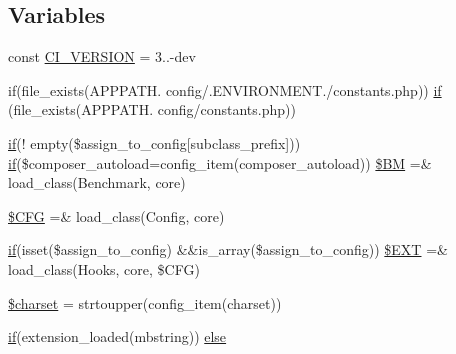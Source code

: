 \subsection*{Variables}
\begin{DoxyCompactItemize}
\item 
const \mbox{\hyperlink{_code_igniter_8php_a32e3c3927ba8ec93df92327dfd85d564}{C\+I\+\_\+\+V\+E\+R\+S\+I\+ON}} = \textquotesingle{}3..-\/dev\textquotesingle{}
\item 
if(file\+\_\+exists(A\+P\+P\+P\+A\+T\+H. \textquotesingle{}config/\textquotesingle{}.E\+N\+V\+I\+R\+O\+N\+M\+E\+N\+T.\textquotesingle{}/constants.\+php\textquotesingle{})) \mbox{\hyperlink{_code_igniter_8php_a565ae1002e1468af84434f86276c519e}{if}} (file\+\_\+exists(A\+P\+P\+P\+A\+T\+H. \textquotesingle{}config/constants.\+php\textquotesingle{}))
\item 
\mbox{\hyperlink{_code_igniter_8php_a565ae1002e1468af84434f86276c519e}{if}}(! empty(\$assign\+\_\+to\+\_\+config\mbox{[}\textquotesingle{}subclass\+\_\+prefix\textquotesingle{}\mbox{]})) \mbox{\hyperlink{_code_igniter_8php_a565ae1002e1468af84434f86276c519e}{if}}(\$composer\+\_\+autoload=config\+\_\+item(\textquotesingle{}composer\+\_\+autoload\textquotesingle{})) \mbox{\hyperlink{_code_igniter_8php_a13e4265227a370a54765a330eaa5b111}{\$\+BM}} =\& load\+\_\+class(\textquotesingle{}Benchmark\textquotesingle{}, \textquotesingle{}core\textquotesingle{})
\item 
\mbox{\hyperlink{_code_igniter_8php_adb9373e11e42b2cd55d1fe249ae72deb}{\$\+C\+FG}} =\& load\+\_\+class(\textquotesingle{}Config\textquotesingle{}, \textquotesingle{}core\textquotesingle{})
\item 
\mbox{\hyperlink{_code_igniter_8php_a565ae1002e1468af84434f86276c519e}{if}}(isset(\$assign\+\_\+to\+\_\+config) \&\&is\+\_\+array(\$assign\+\_\+to\+\_\+config)) \mbox{\hyperlink{_code_igniter_8php_ab412be6f7b1b5d4dba83d6d01d43fd9f}{\$\+E\+XT}} =\& load\+\_\+class(\textquotesingle{}Hooks\textquotesingle{}, \textquotesingle{}core\textquotesingle{}, \$C\+FG)
\item 
\mbox{\hyperlink{_code_igniter_8php_af10158dd74b75f1d337e83102d6b82ce}{\$charset}} = strtoupper(config\+\_\+item(\textquotesingle{}charset\textquotesingle{}))
\item 
\mbox{\hyperlink{_code_igniter_8php_a565ae1002e1468af84434f86276c519e}{if}}(extension\+\_\+loaded(\textquotesingle{}mbstring\textquotesingle{})) \mbox{\hyperlink{_code_igniter_8php_a6574dda0394726f334fcb9695654b02e}{else}}
\item 

\end{DoxyCompactItemize}
